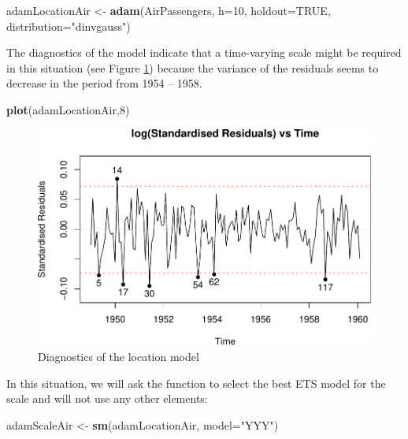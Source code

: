 \documentclass[]{book}
\newenvironment{Shaded}{\begin{snugshade}}{\end{snugshade}}
\newcommand{\DataTypeTok}[1]{\textcolor[rgb]{0.13,0.29,0.53}{#1}}
\newcommand{\DecValTok}[1]{\textcolor[rgb]{0.00,0.00,0.81}{#1}}
\newcommand{\KeywordTok}[1]{\textcolor[rgb]{0.13,0.29,0.53}{\textbf{#1}}}
\newcommand{\NormalTok}[1]{#1}
\newcommand{\OtherTok}[1]{\textcolor[rgb]{0.56,0.35,0.01}{#1}}
\newcommand{\StringTok}[1]{\textcolor[rgb]{0.31,0.60,0.02}{#1}}
\theoremstyle{definition}
\theoremstyle{definition}
\theoremstyle{definition}
\theoremstyle{definition}
\theoremstyle{remark}
\begin{document}
\begin{Shaded}
\begin{Highlighting}[]
\NormalTok{adamLocationAir <-}\StringTok{ }\KeywordTok{adam}\NormalTok{(AirPassengers, }\DataTypeTok{h=}\DecValTok{10}\NormalTok{, }\DataTypeTok{holdout=}\OtherTok{TRUE}\NormalTok{,}
                        \DataTypeTok{distribution=}\StringTok{"dinvgauss"}\NormalTok{)}
\end{Highlighting}
\end{Shaded}

The diagnostics of the model indicate that a time-varying scale might be required in this situation (see Figure \ref{fig:adamModelAirLocationDiagnostics}) because the variance of the residuals seems to decrease in the period from 1954 -- 1958.

\begin{Shaded}
\begin{Highlighting}[]
\KeywordTok{plot}\NormalTok{(adamLocationAir,}\DecValTok{8}\NormalTok{)}
\end{Highlighting}
\end{Shaded}

\begin{figure}
\centering
\includegraphics{Svetunkov--2022----ADAM_files/figure-latex/adamModelAirLocationDiagnostics-1.pdf}
\caption{\label{fig:adamModelAirLocationDiagnostics}Diagnostics of the location model}
\end{figure}

In this situation, we will ask the function to select the best ETS model for the scale and will not use any other elements:

\begin{Shaded}
\begin{Highlighting}[]
\NormalTok{adamScaleAir <-}\StringTok{ }\KeywordTok{sm}\NormalTok{(adamLocationAir, }\DataTypeTok{model=}\StringTok{"YYY"}\NormalTok{)}
\end{Highlighting}
\end{Shaded}
\end{document}
